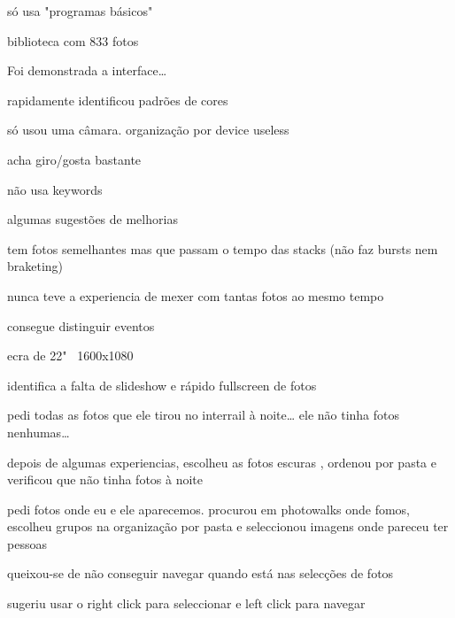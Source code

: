 \begin{myitemize}

	\item * só usa "programas básicos"

	\item biblioteca com 833 fotos

	\item Foi demonstrada a interface…

	\item * rapidamente identificou padrões de cores

	\item só usou uma câmara. organização por device useless

	\item * acha giro/gosta bastante

	\item não usa keywords

	\item * algumas sugestões de melhorias

	\item tem fotos semelhantes mas que passam o tempo das stacks (não faz bursts nem braketing)

	\item * nunca teve a experiencia de mexer com tantas fotos ao mesmo tempo

	\item * consegue distinguir eventos

	\item ecra de 22" ~1600x1080

	\item * identifica a falta de slideshow e rápido fullscreen de fotos

	\item pedi todas as fotos que ele tirou no interrail à noite… ele não tinha fotos nenhumas…

	\item depois de algumas experiencias, escolheu as fotos escuras , ordenou por pasta e verificou que não tinha fotos à noite

	\item pedi fotos onde eu e ele aparecemos. procurou em photowalks onde fomos, escolheu grupos na organização por pasta e seleccionou imagens onde pareceu ter pessoas

	\item queixou-se de não conseguir navegar quando está nas selecções de fotos

	\item sugeriu usar o right click para seleccionar e left click para navegar



\end{myitemize}
